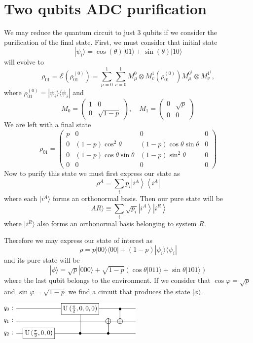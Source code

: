 \documentclass[a4paper, onecolumn]{article}
\begin{document}
	\section{Two qubits ADC purification}
		We may reduce the quantum circuit to just 3 qubits if we consider the purification of the final state. First, we must consider that initial state
		$$
			|\psi_i\rangle=\cos(\theta)|01\rangle + \sin(\theta)|10\rangle
		$$
		will evolve to
		$$
		\rho_{01}=\mathcal{E}\left(\rho_{01}^{(0)}\right)=\sum_{\mu=0}^1 \sum_{v=0}^1 M_\mu^0 \otimes M_v^1\left(\rho_{01}^{(0)}\right) M_\mu^{0^{\dagger}} \otimes M_v^{1^{\dagger}},
		$$
		where $\rho_{01}^{(0)} = |\psi_i\rangle\langle\psi_i|$ and
		$$
		M_0=\left(\begin{array}{cc}
		1 & 0 \\
		0 & \sqrt{1-p}
		\end{array}\right), \quad M_1=\left(\begin{array}{cc}
		0 & \sqrt{p} \\
		0 & 0
		\end{array}\right)
		$$
		We are left with a final state
		$$
		\rho_{01}=\left(\begin{array}{cccc}
		p & 0 & 0 & 0 \\
		0 & (1-p) \cos ^2 \theta & (1-p) \cos \theta \sin \theta & 0 \\
		0 & (1-p) \cos \theta \sin \theta & (1-p) \sin ^2 \theta & 0 \\
		0 & 0 & 0 & 0
		\end{array}\right)
		$$
		Now to purify this state \cite{nielsen_quantum_2010} we must first express our state as
		$$
		\rho^A=\sum_i p_i\left|i^A\right\rangle\left\langle i^A\right|
		$$
		where each $|i^A\rangle$ forms an orthonormal basis. Then our pure state will be
		$$
		|A R\rangle \equiv \sum_i \sqrt{p_i}\left|i^A\right\rangle\left|i^R\right\rangle
		$$
		where $|i^R\rangle$ also forms an orthonormal basis belonging to system $R$.

		Therefore we may express our state of interest as
		$$
		\rho=p|00\rangle\langle 00|+(1-p)| \psi_i\rangle\langle\psi_i|
		$$
		and its pure state will be
		$$
		|\phi\rangle=\sqrt{p}|000\rangle+\sqrt{1-p}(\cos \theta|011\rangle+\sin \theta|101\rangle)
		$$
		where the last qubit belongs to the environment. If we consider that $\cos\varphi=\sqrt{p}$ and $\sin\varphi=\sqrt{1-p}$ we find a circuit that produces the state $|\phi\rangle$.

		\begin{center}
			\includegraphics[width=200pt]{img/adc_2q_v1.png}
			\label{adc_2q_v1}
		\end{center}
\end{document}
